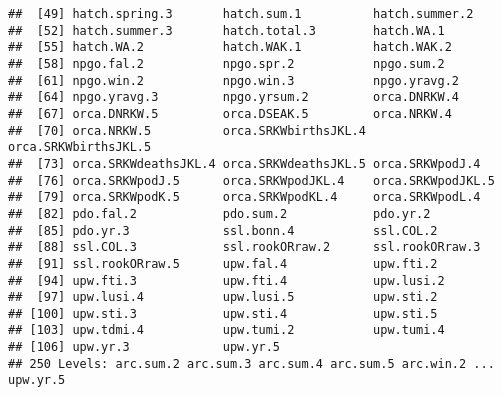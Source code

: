 \documentclass[]{article}
\begin{document}
\begin{verbatim}
##  [49] hatch.spring.3       hatch.sum.1          hatch.summer.2      
##  [52] hatch.summer.3       hatch.total.3        hatch.WA.1          
##  [55] hatch.WA.2           hatch.WAK.1          hatch.WAK.2         
##  [58] npgo.fal.2           npgo.spr.2           npgo.sum.2          
##  [61] npgo.win.2           npgo.win.3           npgo.yravg.2        
##  [64] npgo.yravg.3         npgo.yrsum.2         orca.DNRKW.4        
##  [67] orca.DNRKW.5         orca.DSEAK.5         orca.NRKW.4         
##  [70] orca.NRKW.5          orca.SRKWbirthsJKL.4 orca.SRKWbirthsJKL.5
##  [73] orca.SRKWdeathsJKL.4 orca.SRKWdeathsJKL.5 orca.SRKWpodJ.4     
##  [76] orca.SRKWpodJ.5      orca.SRKWpodJKL.4    orca.SRKWpodJKL.5   
##  [79] orca.SRKWpodK.5      orca.SRKWpodKL.4     orca.SRKWpodL.4     
##  [82] pdo.fal.2            pdo.sum.2            pdo.yr.2            
##  [85] pdo.yr.3             ssl.bonn.4           ssl.COL.2           
##  [88] ssl.COL.3            ssl.rookORraw.2      ssl.rookORraw.3     
##  [91] ssl.rookORraw.5      upw.fal.4            upw.fti.2           
##  [94] upw.fti.3            upw.fti.4            upw.lusi.2          
##  [97] upw.lusi.4           upw.lusi.5           upw.sti.2           
## [100] upw.sti.3            upw.sti.4            upw.sti.5           
## [103] upw.tdmi.4           upw.tumi.2           upw.tumi.4          
## [106] upw.yr.3             upw.yr.5            
## 250 Levels: arc.sum.2 arc.sum.3 arc.sum.4 arc.sum.5 arc.win.2 ... upw.yr.5
\end{verbatim}
\end{document}
